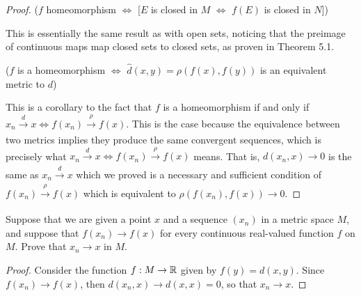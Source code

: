 \begin{proof}
($f$ homeomorphism $\iff$ [$E$ is closed in $M$ $\iff$ $f(E)$ is closed in $N$])

This is essentially the same result as with open sets, noticing that the preimage of continuous maps map closed sets to closed sets, as proven in Theorem 5.1.

($f$ is a homeomorphism $\iff$ $\hat{d}(x,y)=\rho(f(x),f(y))$ is an equivalent metric to $d$)

This is a corollary to the fact that $f$ is a homeomorphism if and only if $x_n\xrightarrow[]{d}x \iff f(x_n)\xrightarrow[]{\rho}f(x)$.
This is the case because the equivalence between two metrics implies they produce the same convergent sequences, which is precisely what $x_n\xrightarrow[]{d}x \iff f(x_n)\xrightarrow[]{\rho}f(x)$ means.
That is, $d(x_n,x)\to 0$ is the same as $x_n\xrightarrow[]{d} x$ which we proved is a necessary and sufficient condition of $f(x_n)\xrightarrow[]{\rho}f(x)$ which is equivalent to $\rho(f(x_n), f(x))\to 0$.
\end{proof} 

\begin{exercise}{53}
Suppose that we are given a point $x$ and a sequence $(x_n)$ in a metric space $M$, and suppose that $f(x_n)\to f(x)$ for every continuous real-valued function $f$ on $M$.
Prove that $x_n\to x$ in $M$.
\end{exercise}
\begin{proof}
Consider the function $f:M\to\mathbb{R}$ given by $f(y)=d(x,y)$.
Since $f(x_n)\to f(x)$, then $d(x_n,x)\to d(x,x) =0$, so that $x_n\to x$.
\end{proof} 

